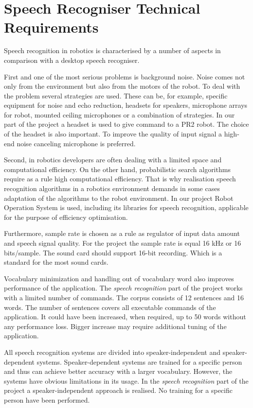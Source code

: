 \documentclass[11pt,a4paper]{report}
\begin{document}
\section {Speech Recogniser Technical Requirements}
Speech recognition in robotics is characterised by a number of aspects in
comparison with a desktop speech recogniser. 

 First and one of the most serious problems is
background noise. Noise comes not only from the environment but also from the
motors of the robot.  To deal with the problem several strategies are used. 
These can be, for example, specific equipment for noise and echo reduction,
headsets for speakers, microphone arrays for robot, mounted ceiling microphones or a
combination of strategies. In our part of the project a headset is used to give
command to a PR2 robot.  The choice of the headset is also important. To improve
the quality of input signal a high-end noise canceling microphone is preferred. 

 Second, in robotics developers are often dealing with  a limited space and
computational efficiency. On the other hand, probabilistic search algorithms
require as a rule high computational efficiency. That is why realisation speech
recognition algorithms in a robotics environment demands  in some
cases adaptation of the algorithms to the robot environment.  In our
project Robot Operation System is used, including its libraries for speech
recognition, applicable for the purpose of efficiency optimisation.

Furthermore, sample rate is chosen as a rule as regulator of
input data amount and speech signal quality. For the project the sample rate is
equal 16 kHz or 16 bits/sample. The sound card should support 16-bit recording.
Which is a standard for the most sound cards. 

 Vocabulary
minimization and handling out of vocabulary word also improves performance of the application. 
The \textit{speech recognition} part of the project works with a limited number
of commands. The corpus consists of 12 sentences and 16 words. The number of 
sentences covers all executable commands of the application. It could have
been increased, when required, up to 50 words without any performance loss.
Bigger increase may require additional tuning of the application. 

All speech recognition systems are divided into speaker-independent and
speaker-dependent systems. 
Speaker-dependent systems are trained for a specific person and thus can achieve
better accuracy with a larger vocabulary. However, the systems have obvious
limitations in its usage.  In the \textit{speech recognition} part of the
project a speaker-independent approach is realised.  No training for a specific
person have been performed. 
\end{document}
